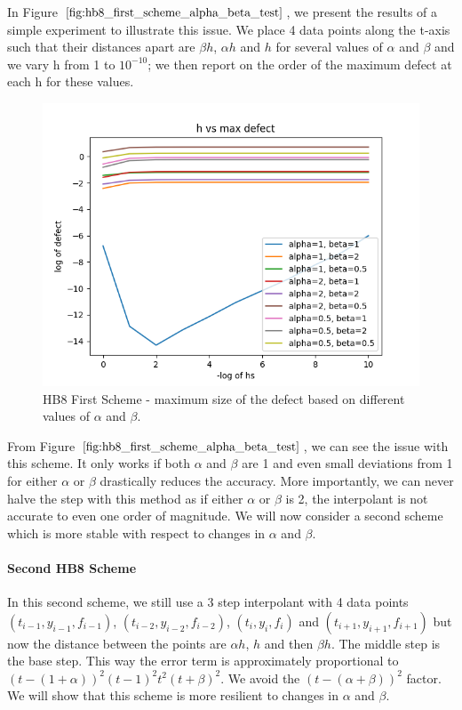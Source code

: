 In Figure $\ref{fig:hb8_first_scheme_alpha_beta_test}$, we present the results of a simple experiment to illustrate this issue. We place 4 data points along the t-axis such that their distances apart are $\beta h$, $\alpha h$ and $h$ for several values of $\alpha$ and $\beta$ and we vary h from 1 to $10^{-10}$; we then report on the order of the maximum defect at each h for these values.

\begin{figure}[H]
\centering
\includegraphics[width=0.7\linewidth]{./figures/hb8_first_scheme_alpha_beta_test}
\caption{HB8 First Scheme - maximum size of the defect based on different values of $\alpha$ and $\beta$.}
\label{fig:hb8_first_scheme_alpha_beta_test}
\end{figure}

From Figure $\ref{fig:hb8_first_scheme_alpha_beta_test}$, we can see the issue with this scheme. It only works if both $\alpha$ and $\beta$ are 1 and even small deviations from 1 for either $\alpha$ or $\beta$ drastically reduces the accuracy. More importantly, we can never halve the step with this method as if either $\alpha$ or $\beta$ is 2, the interpolant is not accurate to even one order of magnitude. We will now consider a second scheme which is more stable with respect to changes in $\alpha$ and $\beta$.

\paragraph{Second HB8 Scheme}
In this second scheme, we still use a 3 step interpolant with 4 data points $(t_{i-1}, y_{i-1}, f_{i-1})$, $(t_{i-2}, y_{i-2}, f_{i-2})$, $(t_{i}, y_{i}, f_{i})$ and $(t_{i+1}, y_{i+1}, f_{i+1})$ but now the distance between the points are $\alpha h$, $h$ and then $\beta h$. The middle step is the base step. This way the error term is approximately proportional to $(t- (1+\alpha))^2(t-1)^2t^2(t+\beta)^2$. We avoid the $(t-(\alpha+\beta))^2$ factor. We will show that this scheme is more resilient to changes in $\alpha$ and $\beta$.

